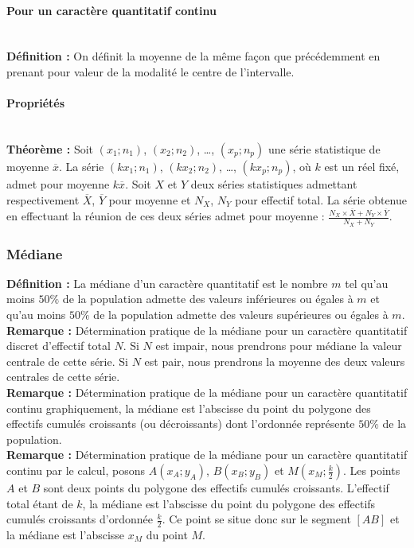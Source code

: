 \documentclass[a4paper,titlepage]{article}
\begin{document}
            \paragraph{Pour un caractère quantitatif continu}\mbox{}\\
                \textbf{Définition :} On définit la moyenne de la même façon que précédemment en prenant pour valeur de la modalité le centre de l’intervalle.
            \paragraph{Propriétés}\mbox{}\\
                \textbf{Théorème :} Soit $\left(x_{1};n_{1}\right)$, $\left(x_{2};n_{2}\right)$, \ldots, $\left(x_{p};n_{p}\right)$ une série statistique de moyenne $\overline{x}$. La série $\left(kx_{1};n_{1}\right)$, $\left(kx_{2};n_{2}\right)$, \ldots, $\left(kx_{p};n_{p}\right)$, où $k$ est un réel fixé, admet pour moyenne $k\overline{x}$. Soit $X$ et $Y$ deux séries statistiques admettant respectivement $\overline{X}$, $\overline{Y}$ pour moyenne et $N_{X}$, $N_{Y}$ pour effectif total. La série obtenue en effectuant la réunion de ces deux séries admet pour moyenne : $\frac{N_{X}\times\overline{X}+N_{Y}\times\overline{Y}}{N_{X}+N_{Y}}$.
        \subsubsection{Médiane}
            \textbf{Définition :} La médiane d’un caractère quantitatif est le nombre $m$ tel qu’au moins $50\%$ de la population admette des valeurs inférieures ou égales à $m$ et qu’au moins $50\%$ de la population admette des valeurs supérieures ou égales à $m$.
            \\
            \textbf{Remarque :} Détermination pratique de la médiane pour un caractère quantitatif discret d’effectif total $N$. Si $N$ est impair, nous prendrons pour médiane la valeur centrale de cette série. Si $N$ est pair, nous prendrons la moyenne des deux valeurs centrales de cette série.
            \\
            \textbf{Remarque :} Détermination pratique de la médiane pour un caractère quantitatif continu graphiquement, la médiane est l’abscisse du point du polygone des effectifs cumulés croissants (ou décroissants) dont l’ordonnée représente $50\%$ de la population.
            \\
            \textbf{Remarque :} Détermination pratique de la médiane pour un caractère quantitatif continu par le calcul, posons $A\left(x_{A};y_{A}\right)$, $B\left(x_{B};y_{B}\right)$ et $M\left(x_{M};\frac{k}{2}\right)$. Les points $A$ et $B$ sont deux points du polygone des effectifs cumulés croissants. L’effectif total étant de $k$, la médiane est l’abscisse du point du polygone des effectifs cumulés croissants d’ordonnée $\frac{k}{2}$. Ce point se situe donc sur le segment $\left[AB\right]$ et la médiane est l’abscisse $x_{M}$ du point $M$.
\end{document}
